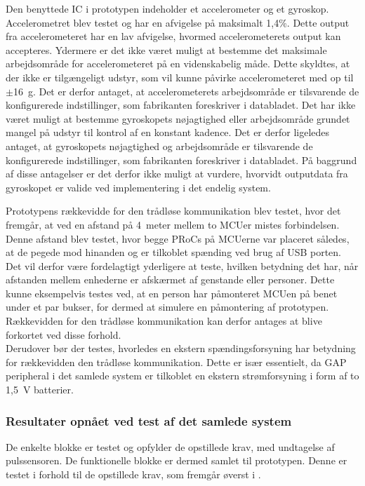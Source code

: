 Den benyttede IC i prototypen indeholder et accelerometer og et gyroskop. Accelerometret blev testet og har en afvigelse på maksimalt 1,4\%. Dette output fra accelerometeret har en lav afvigelse, hvormed accelerometerets output kan accepteres. Ydermere er det ikke været muligt at bestemme det maksimale arbejdsområde for accelerometeret på en videnskabelig måde. Dette skyldtes, at der ikke er tilgængeligt udstyr, som vil kunne påvirke accelerometeret med op til $\pm$16~g. Det er derfor antaget, at accelerometerets arbejdsområde er tilsvarende de konfigurerede indstillinger, som fabrikanten foreskriver i databladet. Det har ikke været muligt at bestemme gyroskopets nøjagtighed eller arbejdsområde grundet mangel på udstyr til kontrol af en konstant kadence. Det er derfor ligeledes antaget, at gyroskopets nøjagtighed og arbejdsområde er tilsvarende de konfigurerede indstillinger, som fabrikanten foreskriver i databladet. På baggrund af disse antagelser er det derfor ikke muligt at vurdere, hvorvidt outputdata fra gyroskopet er valide ved implementering i det endelig system. 

Prototypens rækkevidde for den trådløse kommunikation blev testet, hvor det fremgår, at ved en afstand på 4~meter mellem to MCUer mistes forbindelsen. Denne afstand blev testet, hvor begge PRoCs på MCUerne var placeret således, at de pegede mod hinanden og er tilkoblet spænding ved brug af USB porten. Det vil derfor være fordelagtigt yderligere at teste, hvilken betydning det har, når afstanden mellem enhederne er afskærmet af genstande eller personer. Dette kunne eksempelvis testes ved, at en person har påmonteret MCUen på benet under et par bukser, for dermed at simulere en påmontering af prototypen. Rækkevidden for den trådløse kommunikation kan derfor antages at blive forkortet ved disse forhold. \\
Derudover bør der testes, hvorledes en ekstern spændingsforsyning har betydning for rækkevidden den trådløse kommunikation. Dette er især essentielt, da GAP peripheral i det samlede system er tilkoblet en ekstern strømforsyning i form af to 1,5~V batterier.

\subsubsection{Resultater opnået ved test af det samlede system}
De enkelte blokke er testet og opfylder de opstillede krav, med undtagelse af pulssensoren. De funktionelle blokke er dermed samlet til prototypen. Denne er testet i forhold til de opstillede krav, som fremgår øverst i .


